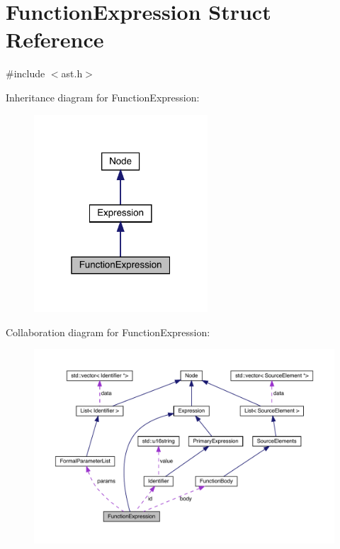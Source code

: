 \hypertarget{struct_function_expression}{}\section{Function\+Expression Struct Reference}
\label{struct_function_expression}


{\ttfamily \#include $<$ast.\+h$>$}



Inheritance diagram for Function\+Expression\+:\nopagebreak
\begin{figure}[H]
\begin{center}
\leavevmode
\includegraphics[width=184pt]{struct_function_expression__inherit__graph}
\end{center}
\end{figure}


Collaboration diagram for Function\+Expression\+:\nopagebreak
\begin{figure}[H]
\begin{center}
\leavevmode
\includegraphics[width=350pt]{struct_function_expression__coll__graph}
\end{center}
\end{figure}
